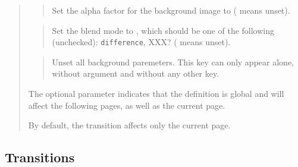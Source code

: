 \documentclass[12pt]{article}
\begin{document}
\begin{quote}
\begin{quote}
\begin {itemize}
\end {itemize}
\end{quote}

\begin{quote}
Set the alpha factor for the background image to 
( means unset).
\end{quote}

\begin{quote}
Set the blend mode to , which should be one of the
following (unchecked): {\tt difference}, XXX?
( means unset).
\end{quote}

\goodbreak
{}
\begin{quote}
Unset all background paremeters.
This key can only appear alone, without argument and without any other key. 
\end{quote}
The optional parameter  indicates that
the definition is global and will affect the following pages, 
as well as the current page. 

By default, the transition affects only the current page. 
\end{quote}

\subsection {Transitions}
\end{document}
